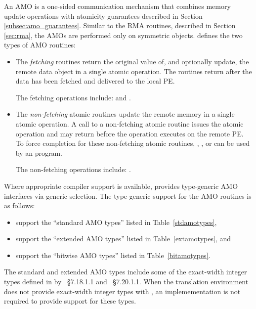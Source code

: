 An \ac{AMO} is a one-sided communication mechanism that combines memory update
operations with atomicity guarantees described in Section
\ref{subsec:amo_guarantees}.  Similar to the \ac{RMA} routines, described in
Section \ref{sec:rma}, the \acp{AMO} are performed only on symmetric objects.
\openshmem{} defines the two types of \ac{AMO} routines:
\begin{itemize}
\item
The \textit{fetching} routines return the original value of, and optionally
update, the remote data object in a single atomic operation.  The routines
return after the data has been fetched and delivered to the local \ac{PE}.

The fetching operations include:
 and
.

\item
The \textit{non-fetching} atomic routines update the remote memory in a single
atomic operation.  A call to a non-fetching atomic routine issues the atomic
operation and may return before the operation executes on the remote \ac{PE}.
To force completion for these non-fetching atomic routines,
, , or  can
be used by an \openshmem{} program.

The non-fetching operations include:
.
\end{itemize}

Where appropriate compiler support is available, \openshmem{} provides
type-generic \ac{AMO} interfaces via \Cstd[11] generic selection.
The type-generic support for the \ac{AMO} routines is as follows:

\begin{itemize}
\item {} support
      the ``standard \ac{AMO} types'' listed in Table~\ref{stdamotypes},
\item {} support
      the ``extended \ac{AMO} types'' listed in Table~\ref{extamotypes}, and
\item {}
      support the ``bitwise \ac{AMO} types'' listed in Table~\ref{bitamotypes}.
\end{itemize}

The standard and extended \ac{AMO} types include some of the exact-width
integer types defined in  by \Cstd[99]~\S7.18.1.1 and
\Cstd[11]~\S7.20.1.1. When the \Cstd translation environment
does not provide exact-width integer types with , an
\openshmem implemementation is not required to provide support for these types.




